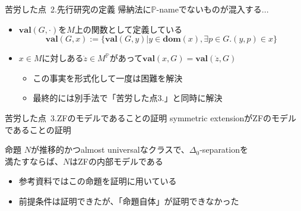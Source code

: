 \documentclass[17pt,aspectratio=169]{beamer}
\newcommand{\Pbb}{\mathbb{P}}
\begin{document}
\begin{frame}{苦労した点\, {\normalsize 2.先行研究の定義}}
    帰納法に$\Pbb$-nameでないものが混入する...
    {
    \small
    \begin{itemize}[itemsep=8pt]
        \item $\mathbf{val}(G, \cdot)$を$M$上の関数として定義している
              $$\mathbf{val}(G, x) := \{ \mathbf{val}(G, y) | y \in \mathbf{dom}(x), \exists p \in G. (y, p) \in x \}$$
        \item $x \in M$に対しある$\dot{z} \in M^\Pbb$があって$\mathbf{val}(x, G) = \mathbf{val}(\dot{z}, G)$
              \vspace{5pt}
              \begin{itemize}
                  \item この事実を形式化して一度は困難を解決
                  \item 最終的には別手法で「苦労した点3.」と同時に解決
              \end{itemize}
    \end{itemize}

    }
\end{frame}

\begin{frame}{苦労した点\, {\normalsize 3.ZFのモデルであることの証明}}
    symmetric extensionがZFのモデルであることの証明
    \begin{itembox}[l]{命題}
        {\small
            $N$が推移的かつalmost universalなクラスで、$\Delta_0$-separationを\\
            満たすならば、$N$はZFの内部モデルである
        }
    \end{itembox}
    {\small
    \begin{itemize}[itemsep=8pt]
        \item 参考資料ではこの命題を証明に用いている
        \item 前提条件は証明できたが、「命題自体」が証明できなかった
    \end{itemize}
    }
\end{frame}
\end{document}
